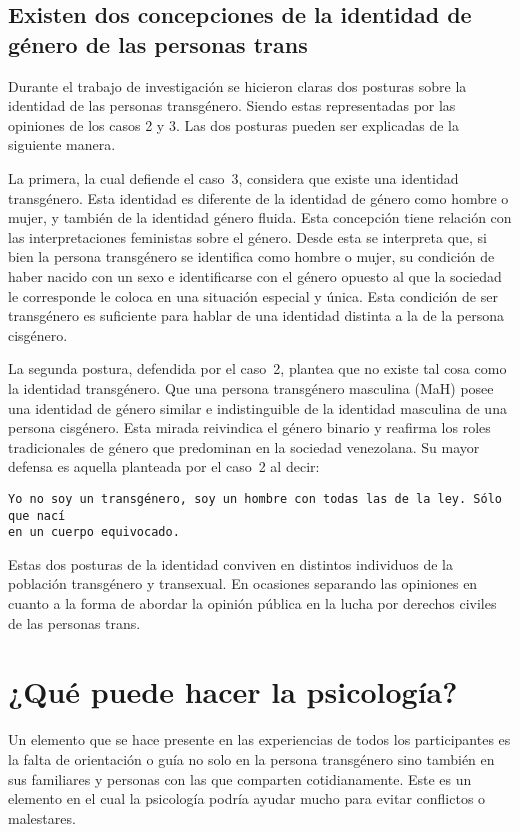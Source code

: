 \subsection[Dos concepciones de la identidad]{Existen dos concepciones de la
identidad de género de las personas trans}

Durante el trabajo de investigación se hicieron claras dos posturas sobre la
identidad de las personas transgénero. Siendo estas representadas por las
opiniones de los casos 2 y 3. Las dos posturas pueden ser explicadas de la
siguiente manera.

La primera, la cual defiende el caso~3, considera que existe una identidad
transgénero. Esta identidad es diferente de la identidad de género como hombre o
mujer, y también de la identidad género fluida. Esta concepción tiene relación
con las interpretaciones feministas sobre el género. Desde esta se interpreta
que, si bien la persona transgénero se identifica como hombre o mujer, su
condición de haber nacido con un sexo e identificarse con el género opuesto al
que la sociedad le corresponde le coloca en una situación especial y única. Esta
condición de ser transgénero es suficiente para hablar de una identidad distinta
a la de la persona cisgénero.

La segunda postura, defendida por el caso~2, plantea que no existe tal cosa como
la identidad transgénero. Que una persona transgénero masculina (MaH) posee una
identidad de género similar e indistinguible de la identidad masculina de una
persona cisgénero. Esta mirada reivindica el género binario y reafirma los roles
tradicionales de género que predominan en la sociedad venezolana. Su mayor
defensa es aquella planteada por el caso~2 al decir:

\begin{verbatim}
Yo no soy un transgénero, soy un hombre con todas las de la ley. Sólo que nací
en un cuerpo equivocado.
\end{verbatim}

Estas dos posturas de la identidad conviven en distintos individuos de la
población transgénero y transexual. En ocasiones separando las opiniones en
cuanto a la forma de abordar la opinión pública en la lucha por derechos civiles
de las personas trans.

\section{¿Qué puede hacer la psicología?}

Un elemento que se hace presente en las experiencias de todos los participantes
es la falta de orientación o guía no solo en la persona transgénero sino también
en sus familiares y personas con las que comparten cotidianamente. Este es un
elemento en el cual la psicología podría ayudar mucho para evitar conflictos o
malestares.

